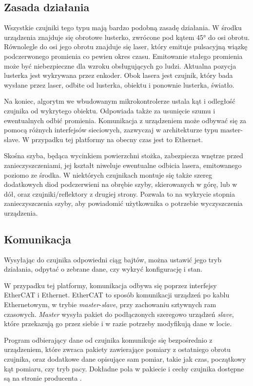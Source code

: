 	\subsection{Zasada działania}
		Wszystkie czujniki tego typu mają bardzo podobną zasadę działania.
		W środku urządzenia znajduje się obrotowe lusterko, zwrócone pod kątem 45° do osi obrotu.
		Równolegle do osi jego obrotu znajduje się laser, który emituje pulsacyjną wiązkę podczerwonego promienia co pewien okres czasu.
		Emitowanie stałego promienia może być niebezpieczne dla wzroku obsługujących go ludzi.
		Aktualna pozycja lusterka jest wykrywana przez enkoder.
		Obok lasera jest czujnik, który bada wysłane przez laser, odbite od lusterka, obiektu i ponownie lusterka, światło.

		Na koniec, algorytm we wbudowanym mikrokontrolerze ustala kąt i odległość czujnika od wykrytego obiektu.
		Odpowiada także za usunięcie szumu i ewentualnych odbić promienia.
		Komunikacja z urządzeniem może odbywać się za pomocą różnych interfejsów sieciowych, zazwyczaj w architekturze typu master-slave.
		W przypadku tej platformy na obecny czas jest to Ethernet.
		
		Skośna szyba, będąca wycinkiem powierzchni stożka, zabezpiecza wnętrze przed zanieczyszczeniami, jej kształt niweluje ewentualne odbicia lasera, emitowanego poziomo ze środka.
		W niektórych czujnikach montuje się także szereg dodatkowych diod podczerwieni na obrębie szyby, skierowanych w górę, lub w dół, oraz czujniki/reflektory z drugiej strony.
		Pozwala to na wykrycie stopnia zanieczyszczenia szyby, aby powiadomić użytkownika o potrzebie wyczyszczenia urządzenia.

	\subsection{Komunikacja}
		Wysyłając do czujnika odpowiedni ciąg bajtów, można ustawić jego tryb działania, odpytać o zebrane dane, czy wykryć konfigurację i stan.

		W przypadku tej platformy, komunikacja odbywa się poprzez interfejsy EtherCAT i Ethernet.
		EtherCAT to sposób komunikacji urządzeń po kablu Ethernetowym, w trybie \emph{master}-\emph{slave}, przy zachowaniu sztywnych ram czasowych. 
		\emph{Master} wysyła pakiet do podłączonych szeregowo urządzeń \emph{slave}, które przekazują go przez siebie i w razie potrzeby modyfikują dane w locie.
		
		Program odbierający dane od czujnika komunikuje się bezpośrednio z urządzeniem, które zwraca pakiety zawierające pomiary z ostatniego obrotu czujnika, oraz dodatkowe dane 
		opisujące sam pomiar, takie jak czas, początkowy kąt pomiaru, czy tryb pacy.
		Dokładne pola w pakiecie i cechy czujnika dostępne są na stronie producenta \cite{sick_website}.

